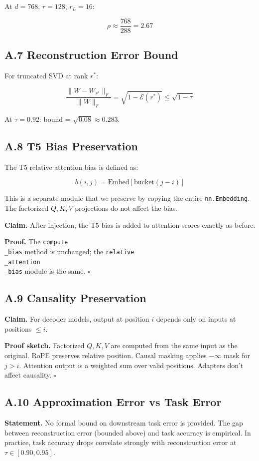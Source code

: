 At $d = 768$, $r = 128$, $r_L = 16$:

\[
\rho \approx \frac{768}{288} = 2.67
\tag{A.9}
\]

\subsection{A.7 Reconstruction Error Bound}

For truncated SVD at rank $r^*$:

\[
\frac{\|W - W_{r^*}\|_F}{\|W\|_F} = \sqrt{1 - \mathcal{E}(r^*)} \leq \sqrt{1 - \tau}
\tag{A.10}
\]

At $\tau = 0.92$: bound = $\sqrt{0.08} \approx 0.283$.

\subsection{A.8 T5 Bias Preservation}

The T5 relative attention bias is defined as:

\[
b(i, j) = \text{Embed}[\text{bucket}(j - i)]
\tag{A.11}
\]

This is a separate module that we preserve by copying the entire \texttt{nn.Embedding}. 
The factorized $Q, K, V$ projections do not affect the bias.

\textbf{Claim.} After injection, the T5 bias is added to attention scores exactly 
as before.

\textbf{Proof.} The \texttt{compute\\_bias} method is unchanged; the \texttt{relative\\_attention\\_bias} 
module is the same. $\square$

\subsection{A.9 Causality Preservation}

\textbf{Claim.} For decoder models, output at position $i$ depends only on inputs 
at positions $\leq i$.

\textbf{Proof sketch.} Factorized $Q, K, V$ are computed from the same input as 
the original. RoPE preserves relative position. Causal masking applies 
$-\infty$ mask for $j > i$. Attention output is a weighted sum over valid 
positions. Adapters don't affect causality. $\square$

\subsection{A.10 Approximation Error vs Task Error}

\textbf{Statement.} No formal bound on downstream task error is provided. The gap 
between reconstruction error (bounded above) and task accuracy is 
empirical. In practice, task accuracy drops correlate strongly with 
reconstruction error at $\tau \in [0.90, 0.95]$.